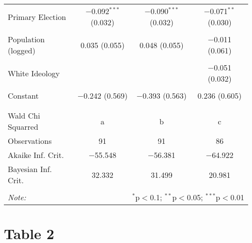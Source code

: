 \documentclass[]{article}
\begin{document}
\begin{table}[!htbp]
\begin{tabular}{@{\extracolsep{5pt}}lccc}
 Primary Election & $-$0.092$^{***}$ (0.032) & $-$0.090$^{***}$ (0.032) & $-$0.071$^{**}$ (0.030) \\ 
  & & & \\ 
 Population (logged) & 0.035 (0.055) & 0.048 (0.055) & $-$0.011 (0.061) \\ 
  & & & \\ 
 White Ideology &  &  & $-$0.051 (0.032) \\ 
  & & & \\ 
 Constant & $-$0.242 (0.569) & $-$0.393 (0.563) & 0.236 (0.605) \\ 
  & & & \\ 
\hline \\[-1.8ex] 
Wald Chi Squarred & a & b & c \\ 
Observations & 91 & 91 & 86 \\ 
Akaike Inf. Crit. & $-$55.548 & $-$56.381 & $-$64.922 \\ 
Bayesian Inf. Crit. & 32.332 & 31.499 & 20.981 \\ 
\hline 
\hline \\[-1.8ex] 
\textit{Note:}  & \multicolumn{3}{r}{$^{*}$p$<$0.1; $^{**}$p$<$0.05; $^{***}$p$<$0.01} \\ 
\end{tabular} 
\end{table}

\hypertarget{table-2}{%
\section{Table 2}\label{table-2}}
\end{document}
